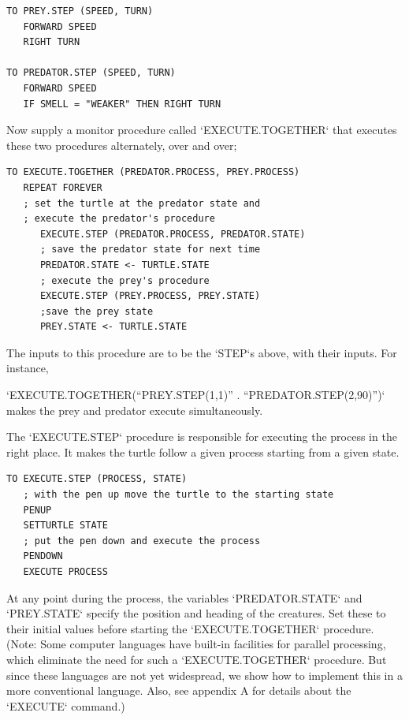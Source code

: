 \documentclass{book}
\begin{document}
\begin{verbatim}
TO PREY.STEP (SPEED, TURN)
   FORWARD SPEED
   RIGHT TURN

TO PREDATOR.STEP (SPEED, TURN)
   FORWARD SPEED
   IF SMELL = "WEAKER" THEN RIGHT TURN
\end{verbatim}
Now supply a monitor procedure called \textsc{`EXECUTE.TOGETHER`} that executes these two procedures alternately, over and over;

\begin{verbatim}
TO EXECUTE.TOGETHER (PREDATOR.PROCESS, PREY.PROCESS)
   REPEAT FOREVER
   ; set the turtle at the predator state and
   ; execute the predator's procedure
      EXECUTE.STEP (PREDATOR.PROCESS, PREDATOR.STATE)
      ; save the predator state for next time
      PREDATOR.STATE <- TURTLE.STATE
      ; execute the prey's procedure
      EXECUTE.STEP (PREY.PROCESS, PREY.STATE)
      ;save the prey state
      PREY.STATE <- TURTLE.STATE
\end{verbatim}
The inputs to this procedure are to be the \textsc{`STEP`}s above, with their inputs.
For instance,

\textsc{`EXECUTE.TOGETHER(``PREY.STEP(1,1)'' . ``PREDATOR.STEP(2,90)'')`} 
makes the prey and predator execute simultaneously.

The \textsc{`EXECUTE.STEP`} procedure is responsible for executing the process
in the right place. It makes the turtle follow a given process starting
from a given state.

\begin{verbatim}
TO EXECUTE.STEP (PROCESS, STATE)
   ; with the pen up move the turtle to the starting state
   PENUP
   SETTURTLE STATE
   ; put the pen down and execute the process
   PENDOWN
   EXECUTE PROCESS
\end{verbatim}
At any point during the process, the variables \textsc{`PREDATOR.STATE`} and
\textsc{`PREY.STATE`} specify the position and heading of the creatures. Set
these to their initial values before starting the \textsc{`EXECUTE.TOGETHER`} procedure. (Note: Some computer languages have built-in facilities for parallel
processing, which eliminate the need for such a \textsc{`EXECUTE.TOGETHER`} procedure. But since these languages are not yet widespread, we show how
to implement this in a more conventional language. Also, see appendix
A for details about the \textsc{`EXECUTE`} command.)
\end{document}
